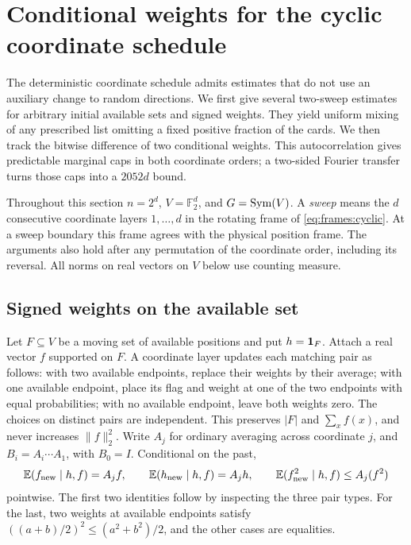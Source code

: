 \section{Conditional weights for the cyclic coordinate schedule}
\label{cycles:section}

The deterministic coordinate schedule admits estimates that do not use an
auxiliary change to random directions. We first give several two-sweep
estimates for arbitrary initial available sets and signed weights. They
yield uniform mixing of
any prescribed list omitting a fixed positive fraction of the cards.
We then track the bitwise difference of two conditional weights. This
autocorrelation gives predictable marginal caps in both coordinate orders;
a two-sided Fourier transfer turns those caps into a $2052d$ bound.

Throughout this section $n=2^d$, $V=\mathbb F_2^d$, and $G=\operatorname{Sym}(V)$.
A \emph{sweep} means the $d$ consecutive coordinate layers
$1,\ldots,d$ in the rotating frame of
\eqref{eq:frames:cyclic}. At a sweep boundary this frame agrees with the
physical position frame. The arguments also hold after any permutation
of the coordinate order, including its reversal. All norms on real
vectors on $V$ below use counting measure.

\subsection{Signed weights on the available set}
\label{cycles:weights}

Let $F\subseteq V$ be a moving set of available positions and put
$h=\mathbf 1_F$. Attach a real vector $f$ supported on $F$. A coordinate layer
updates each matching pair as follows: with two available endpoints, replace
their weights by their average; with one available endpoint, place its flag
and weight at one of the two endpoints with equal probabilities; with
no available endpoint, leave both weights zero. The choices on distinct pairs
are independent. This preserves $|F|$ and $\sum_x f(x)$, and never
increases $\|f\|_2^2$. Write $A_j$ for ordinary averaging across coordinate
$j$, and $B_i=A_i\cdots A_1$, with $B_0=I$. Conditional on the past,
\begin{equation}\label{cycles:mean-update}
 \mathbb E(f_{\rm new}\mid h,f)=A_jf,\qquad
 \mathbb E(h_{\rm new}\mid h,f)=A_jh,\qquad
 \mathbb E(f_{\rm new}^2\mid h,f)\le A_j(f^2)
\end{equation}
pointwise. The first two identities follow by inspecting the three pair
types. For the last, two weights at available endpoints satisfy
$((a+b)/2)^2\le(a^2+b^2)/2$, and the other cases are equalities.

